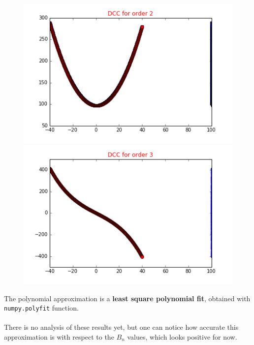 \documentclass[a4,12pt]{article}
\begin{document}
\begin{figure}[h!]
   \begin{minipage}[c]{.46\linewidth}
      \includegraphics[scale=0.5]{../images/dcc/DCC2.png} 
   \end{minipage} \hfill
   \begin{minipage}[c]{.46\linewidth}
      \includegraphics[scale=0.5]{../images/dcc/DCC3.png} 
   \end{minipage}
\end{figure}

The polynomial approximation is a \textbf{least square polynomial fit}, obtained with \verb!numpy.polyfit! function. \\ \\
There is no analysis of these results yet, but one can notice how accurate this approximation is with respect to the $B_n$ values, which looks positive for now. 
\newpage



\end{document}
